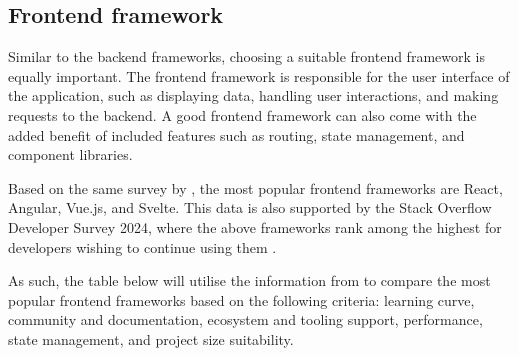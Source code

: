 \subsection{Frontend framework}

Similar to the backend frameworks, choosing a suitable frontend framework is equally important. The frontend framework is responsible for the user interface of the application, such as displaying data, handling user interactions, and making requests to the backend. A good frontend framework can also come with the added benefit of included features such as routing, state management, and component libraries. 

Based on the same survey by \textcite{statista-webframeworks}, the most popular frontend frameworks are React, Angular, Vue.js, and Svelte. This data is also supported by the Stack Overflow Developer Survey 2024, where the above frameworks rank among the highest for developers wishing to continue using them \parencite{stackoverflow}.

As such, the table below will utilise the information from \textcite{react,angular,vue,svelte} to compare the most popular frontend frameworks based on the following criteria: learning curve, community and documentation, ecosystem and tooling support, performance, state management, and project size suitability.

\begin{table}[h]
    \centering
    \caption{Comparison of frontend frameworks}
    \label{tab:frontend}
\end{table}


